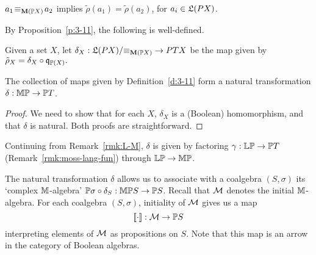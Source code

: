 \documentclass{book}
\begin{document}
\begin{proposition}
\label{p:3-11}
$a_{1} \!\equiv_{\mathbf{M}(\mathbb{P} X)}\! a_{2}$ implies $\tilde{\rho}(a_{1}) =
\tilde{\rho}(a_{2})$, for $a_i \in \mathfrak{L}(P X)$.
\end{proposition}


By Proposition~\ref{p:3-11}, the following is well-defined.

\begin{definition}
\label{d:3-11}
Given a set $X$, let $\delta_{X}: \mathfrak{L}(P X)/{\equiv_{\mathbf{M}(\mathbb{P}
X)}} \to
PT X$ be the map given by 
$
\tilde{\rho}_{X} = \delta_{X}\circ \mathfrak{q}_{\mathbb{P} (X)}.
$
\end{definition}

\begin{proposition}
\label{p:3-12}
The collection of maps given by Definition~\ref{d:3-11} form a natural
transformation $\delta: \mathbb{M}\mathbb{P} \to \mathbb{P}T$.
\end{proposition}

\xxviproofspace
\begin{proof}
  We need to show that for each $X$, $\delta_{X}$ is a (Boolean)
  homomorphism, and that $\delta$ is natural. Both proofs are
  straightforward.
\end{proof}

\begin{remark}
  Continuing from Remark~\ref{rmk:L-M}, $\delta$ is given by factoring
  $\gamma:{\mathbb{L}}\mathbb{P}\to\mathbb{P}T$ (Remark~\ref{rmk:moss-lang-fun}) through
  ${\mathbb{L}}\mathbb{P}\to\mathbb{M}\mathbb{P}$.
\end{remark}
%

The natural transformation $\delta$ allows us to associate with a
coalgebra $(S,\sigma)$ its `complex $\mathbb{M}$-algebra'
$\mathbb{P}\sigma\circ\delta_{S}: \mathbb{M}\mathbb{P} S \to \mathbb{P} S$.  Recall that $\mathcal{M}$
denotes the initial $\mathbb{M}$-algebra.  For each coalgebra $(S,\sigma)$,
initiality of $\mathcal{M}$ gives us a map
\begin{equation}\label{equ:M-sem}
\mathopen{[\![} \cdot \mathclose{]\!]}:\mathcal{M}\to\mathbb{P} S
\end{equation} 
interpreting elements of $\mathcal{M}$ as propositions on $S$.  Note that
this map is an arrow in the category of Boolean algebras.
\end{document}
